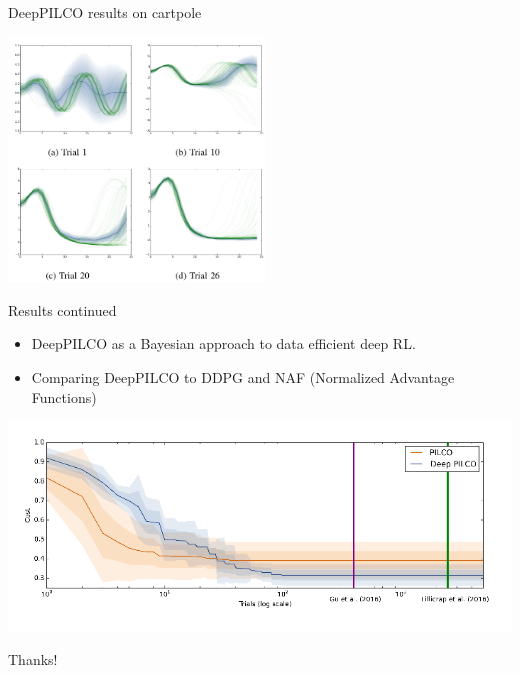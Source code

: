 \documentclass{beamer}
\begin{document}
\begin{frame}{DeepPILCO results on cartpole}
    \begin{center}
        \includegraphics[height=6.5cm]{img/deep-curve.png}
    \end{center}
\end{frame}

\begin{frame}{Results continued}
\begin{itemize}
    \item DeepPILCO as a Bayesian approach to data efficient deep RL.
    \item Comparing DeepPILCO to DDPG and NAF (Normalized Advantage Functions)
\end{itemize}
    
    \includegraphics[width=\textwidth]{img/compare-deep.png}
\end{frame}
\begin{frame}
  \Huge{\centerline{Thanks!}}
\end{frame}
\end{document}
